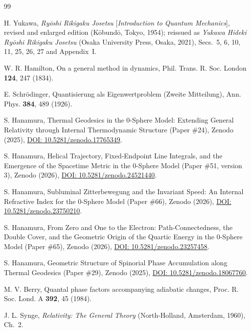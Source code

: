\documentclass[%
 reprint, amsmath,amssymb, aps, prb, ]{revtex4-2}
\numberwithin{equation}{section}
\begin{document}
\begin{thebibliography}{99}

 H. Yukawa, \textit{Ry\=oshi Rikigaku Josetsu} [\textit{Introduction to Quantum Mechanics}], revised and enlarged edition (K\=obund\=o, Tokyo, 1954); reissued as \textit{Yukawa Hideki Ry\=oshi Rikigaku Josetsu} (Osaka University Press, Osaka, 2021), Secs.~5, 6, 10, 11, 25, 26, 27 and Appendix~I.

 W. R. Hamilton, On a general method in dynamics, Phil. Trans. R. Soc. London \textbf{124}, 247 (1834).

 E. Schr\"odinger, Quantisierung als Eigenwertproblem (Zweite Mitteilung), Ann. Phys. \textbf{384}, 489 (1926).

 S. Hanamura, Thermal Geodesics in the 0-Sphere Model: Extending General Relativity through Internal Thermodynamic Structure (Paper \#24), Zenodo (2025), \href{https://doi.org/10.5281/zenodo.17765349}{DOI: 10.5281/zenodo.17765349}.

 S. Hanamura, Helical Trajectory, Fixed-Endpoint Line Integrals, and the Emergence of the Spacetime Metric in the 0-Sphere Model (Paper \#51, version 3), Zenodo (2026), \href{https://doi.org/10.5281/zenodo.24521440}{DOI: 10.5281/zenodo.24521440}.

 S. Hanamura, Subluminal Zitterbewegung and the Invariant Speed: An Internal Refractive Index for the 0-Sphere Model (Paper \#66), Zenodo (2026), \href{https://doi.org/10.5281/zenodo.23750210}{DOI: 10.5281/zenodo.23750210}.

 S. Hanamura, From Zero and One to the Electron: Path-Connectedness, the Double Cover, and the Geometric Origin of the Quartic Energy in the 0-Sphere Model (Paper \#65), Zenodo (2026), \href{https://doi.org/10.5281/zenodo.23257458}{DOI: 10.5281/zenodo.23257458}.

 S. Hanamura, Geometric Structure of Spinorial Phase Accumulation along Thermal Geodesics (Paper \#29), Zenodo (2025), \href{https://doi.org/10.5281/zenodo.18067760}{DOI: 10.5281/zenodo.18067760}.

 M. V. Berry, Quantal phase factors accompanying adiabatic changes, Proc. R. Soc. Lond. A \textbf{392}, 45 (1984).

 J. L. Synge, \textit{Relativity: The General Theory} (North-Holland, Amsterdam, 1960), Ch.~2.


\end{thebibliography}
\end{document}
